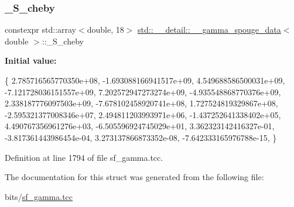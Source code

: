 \subsubsection{\texorpdfstring{\+\_\+\+S\+\_\+cheby}{\_S\_cheby}}
{\footnotesize\ttfamily constexpr std\+::array$<$double, 18$>$ \hyperlink{structstd_1_1____detail_1_1____gamma__spouge__data}{std\+::\+\_\+\+\_\+detail\+::\+\_\+\+\_\+gamma\+\_\+spouge\+\_\+data}$<$ double $>$\+::\+\_\+\+S\+\_\+cheby\hspace{0.3cm}{\ttfamily [static]}}

{\bfseries Initial value\+:}
\begin{DoxyCode}
\{
     2.785716565770350e+08,
    -1.693088166941517e+09,
     4.549688586500031e+09,
    -7.121728036151557e+09,
     7.202572947273274e+09,
    -4.935548868770376e+09,
     2.338187776097503e+09,
    -7.678102458920741e+08,
     1.727524819329867e+08,
    -2.595321377008346e+07,
     2.494811203993971e+06,
    -1.437252641338402e+05,
     4.490767356961276e+03,
    -6.505596924745029e+01,
     3.362323142416327e-01,
    -3.817361443986454e-04,
     3.273137866873352e-08,
    -7.642333165976788e-15,
      \}
\end{DoxyCode}


Definition at line 1794 of file sf\+\_\+gamma.\+tcc.



The documentation for this struct was generated from the following file\+:\begin{DoxyCompactItemize}
\item 
bits/\hyperlink{sf__gamma_8tcc}{sf\+\_\+gamma.\+tcc}\end{DoxyCompactItemize}
